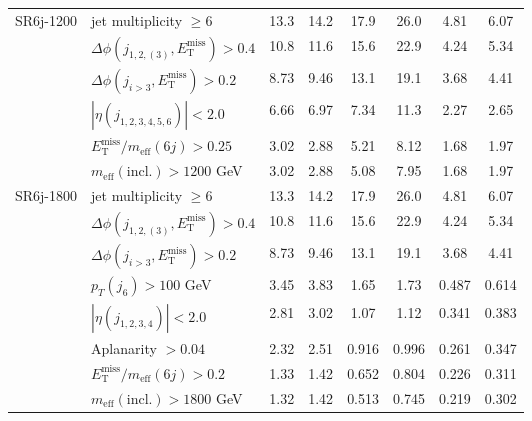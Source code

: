 \documentclass[10pt,fleqn]{article}
\newcommand{\met}{E^\mathrm{miss}_\mathrm{T}}
\newcommand{\meff}{m_\mathrm{eff}}
\begin{document}
\begin{table}[h!]
\begin{tabular}{c|l|c|c|c|c|c|c}
SR6j-1200    & jet multiplicity $\geq 6$                       &     13.3   &   14.2    &  17.9      &   26.0    &      4.81    &   6.07         \\
             & $\Delta\phi(j_{1,2,(3)},\met) > 0.4$            &     10.8   &   11.6    &  15.6      &   22.9    &      4.24    &   5.34         \\
             & $\Delta\phi(j_{i>3},\met) > 0.2$                &     8.73   &   9.46    &  13.1      &   19.1    &      3.68    &   4.41         \\      
             & $|\eta(j_{1,2,3,4,5,6})|< 2.0$                  &     6.66   &   6.97    &  7.34      &   11.3    &      2.27    &   2.65         \\           
             & $\met/\meff(6j) > 0.25$                         &     3.02   &   2.88    &  5.21      &   8.12    &      1.68    &   1.97         \\    
             & $\meff(\mathrm{incl.}) > 1200$ GeV              &     3.02   &   2.88    &  5.08      &   7.95    &      1.68    &   1.97         \\ \midrule        
SR6j-1800    & jet multiplicity $\geq 6$                       &     13.3   &   14.2    &  17.9      &   26.0    &      4.81    &   6.07         \\
             & $\Delta\phi(j_{1,2,(3)},\met) > 0.4$            &     10.8   &   11.6    &  15.6      &   22.9    &      4.24    &   5.34         \\
             & $\Delta\phi(j_{i>3},\met) > 0.2$                &     8.73   &   9.46    &  13.1      &   19.1    &      3.68    &   4.41         \\      
             & $p_T(j_6) > 100$ GeV                            &     3.45   &   3.83    &  1.65      &   1.73    &      0.487   &   0.614        \\      
             & $|\eta(j_{1,2,3,4})|< 2.0$                      &     2.81   &   3.02    &  1.07      &   1.12    &      0.341   &   0.383        \\           
             & Aplanarity $> 0.04$                             &     2.32   &   2.51    &  0.916     &   0.996   &      0.261   &   0.347        \\         
             & $\met/\meff(6j) > 0.2$                          &     1.33   &   1.42    &  0.652     &   0.804   &      0.226   &   0.311        \\    
             & $\meff(\mathrm{incl.}) > 1800$ GeV              &     1.32   &   1.42    &  0.513     &   0.745   &      0.219   &   0.302        \\ \midrule   

\end{tabular}
\end{table}
\end{document}
